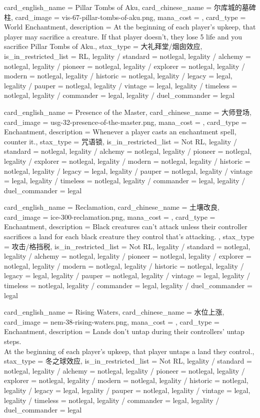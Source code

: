 \documentclass[lang = cn, color = black, 10pt]{AllThatStax}
\begin{document}
\card
{
	card_english_name = {Pillar Tombs of Aku},
	card_chinese_name = {尔库城的墓碑柱},
	card_image = vis-67-pillar-tombs-of-aku.png,
	mana_cost = ,
	card_type = World Enchantment,
	description = {At the beginning of each player's upkeep, that player may sacrifice a creature. If that player doesn't, they lose 5 life and you sacrifice Pillar Tombs of Aku.},
	stax_type = 大礼拜堂/烟囱效应,
	is_in_restricted_list = RL,
	legality / standard = notlegal,
	legality / alchemy = notlegal,
	legality / pioneer = notlegal,
	legality / explorer = notlegal,
	legality / modern = notlegal,
	legality / historic = notlegal,
	legality / legacy = legal,
	legality / pauper = notlegal,
	legality / vintage = legal,
	legality / timeless = notlegal,
	legality / commander = legal,
	legality / duel_commander = legal
}

\card
{
	card_english_name = {Presence of the Master},
	card_chinese_name = {大师登场},
	card_image = usg-32-presence-of-the-master.png,
	mana_cost = ,
	card_type = Enchantment,
	description = {Whenever a player casts an enchantment spell, counter it.},
	stax_type = 咒语锁,
	is_in_restricted_list = Not RL,
	legality / standard = notlegal,
	legality / alchemy = notlegal,
	legality / pioneer = notlegal,
	legality / explorer = notlegal,
	legality / modern = notlegal,
	legality / historic = notlegal,
	legality / legacy = legal,
	legality / pauper = notlegal,
	legality / vintage = legal,
	legality / timeless = notlegal,
	legality / commander = legal,
	legality / duel_commander = legal
}

\card
{
	card_english_name = {Reclamation},
	card_chinese_name = {土壤改良},
	card_image = ice-300-reclamation.png,
	mana_cost = ,
	card_type = Enchantment,
	description = {Black creatures can't attack unless their controller sacrifices a land for each black creature they control that's attacking. },
	stax_type = 攻击/格挡税,
	is_in_restricted_list = Not RL,
	legality / standard = notlegal,
	legality / alchemy = notlegal,
	legality / pioneer = notlegal,
	legality / explorer = notlegal,
	legality / modern = notlegal,
	legality / historic = notlegal,
	legality / legacy = legal,
	legality / pauper = notlegal,
	legality / vintage = legal,
	legality / timeless = notlegal,
	legality / commander = legal,
	legality / duel_commander = legal
}

\card
{
	card_english_name = {Rising Waters},
	card_chinese_name = {水位上涨},
	card_image = nem-38-rising-waters.png,
	mana_cost = ,
	card_type = Enchantment,
	description = {Lands don't untap during their controllers' untap steps.\\
		At the beginning of each player's upkeep, that player untaps a land they control.},
	stax_type = 冬之球效应,
	is_in_restricted_list = Not RL,
	legality / standard = notlegal,
	legality / alchemy = notlegal,
	legality / pioneer = notlegal,
	legality / explorer = notlegal,
	legality / modern = notlegal,
	legality / historic = notlegal,
	legality / legacy = legal,
	legality / pauper = notlegal,
	legality / vintage = legal,
	legality / timeless = notlegal,
	legality / commander = legal,
	legality / duel_commander = legal
}
\end{document}

